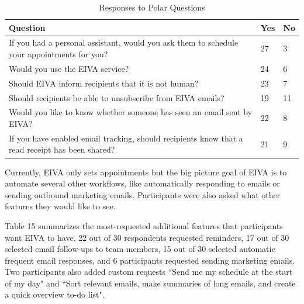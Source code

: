 \documentclass{article}
\begin{document}
\begin{table}[!htb]
	\begin{minipage}{1\linewidth}
		\caption{Responses to Polar Questions}
		\centering
		\begin{tabular}{p{9cm}p{0.75cm}p{0.75cm}}
			\hline
			\textbf{Question}                                                                               & \textbf{Yes} & \textbf{No} \\
			\hline
			If you had a personal assistant, would you ask them to schedule your appointments for you?      & 27           & 3           \\
			Would you use the EIVA service?                                                                 & 24           & 6           \\
			Should EIVA inform recipients that it is not human?                                             & 23           & 7           \\
			Should recipients be able to unsubscribe from EIVA emails?                                      & 19           & 11          \\
			Would you like to know whether someone has seen an email sent by EIVA?                          & 22           & 8           \\
			If you have enabled email tracking, should recipients know that a read receipt has been shared? & 21           & 9           \\
			\hline
		\end{tabular}
	\end{minipage}%
\end{table}

Currently, EIVA only sets appointments but the big picture goal of EIVA is to automate several other workflows, like automatically responding to emails or sending outbound marketing emails. Participants were also asked what other features they would like to see.

Table 15 summarizes the most-requested additional features that participants want EIVA to have. 22 out of 30 respondents requested reminders, 17 out of 30 selected email follow-ups to team members, 15 out of 30 selected automatic frequent email responses, and 6 participants requested sending marketing emails. Two participants also added custom requests ``Send me my schedule at the start of my day" and ``Sort relevant emails, make summaries of long emails, and create a quick overview to-do list".
\end{document}
